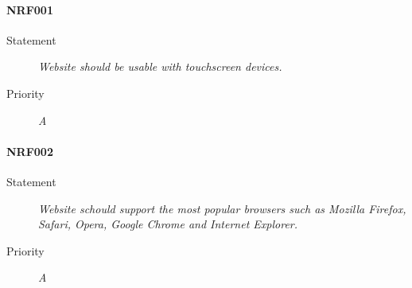 \paragraph{NRF001}
\begin{description}
  \item [Statement] 
    \textit{Website should be usable with touchscreen devices.}
  \item [Priority] \textit{A}
\end{description}

\paragraph{NRF002}
\begin{description}
  \item [Statement] 
    \textit{Website schould support the most popular browsers such as Mozilla Firefox, Safari, Opera, Google Chrome and Internet Explorer.}
  \item [Priority] \textit{A}
\end{description}
